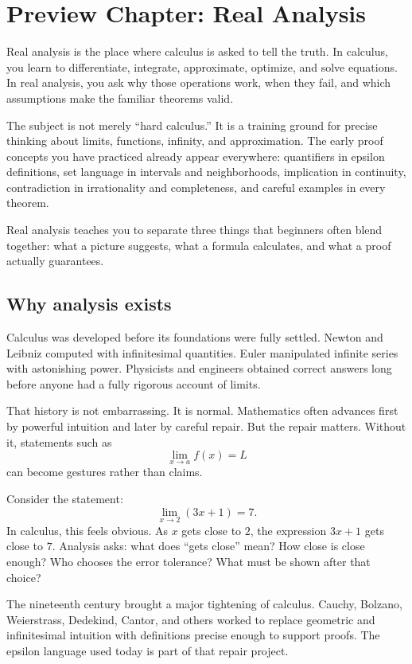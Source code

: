 \section{Preview Chapter: Real Analysis}

Real analysis is the place where calculus is asked to tell the truth. In calculus,
you learn to differentiate, integrate, approximate, optimize, and solve equations.
In real analysis, you ask why those operations work, when they fail, and which
assumptions make the familiar theorems valid.

The subject is not merely ``hard calculus.'' It is a training ground for precise
thinking about limits, functions, infinity, and approximation. The early proof
concepts you have practiced already appear everywhere: quantifiers in epsilon
definitions, set language in intervals and neighborhoods, implication in
continuity, contradiction in irrationality and completeness, and careful examples
in every theorem.

\begin{focusbox}
Real analysis teaches you to separate three things that beginners often blend
together: what a picture suggests, what a formula calculates, and what a proof
actually guarantees.
\end{focusbox}

\subsection{Why analysis exists}

Calculus was developed before its foundations were fully settled. Newton and
Leibniz computed with infinitesimal quantities. Euler manipulated infinite
series with astonishing power. Physicists and engineers obtained correct answers
long before anyone had a fully rigorous account of limits.

That history is not embarrassing. It is normal. Mathematics often advances first
by powerful intuition and later by careful repair. But the repair matters. Without
it, statements such as
\[
\lim_{x\to a} f(x)=L
\]
can become gestures rather than claims.

Consider the statement:
\[
\lim_{x\to 2} (3x+1)=7.
\]
In calculus, this feels obvious. As $x$ gets close to $2$, the expression $3x+1$
gets close to $7$. Analysis asks: what does ``gets close'' mean? How close is
close enough? Who chooses the error tolerance? What must be shown after that
choice?

\begin{historybox}
The nineteenth century brought a major tightening of calculus. Cauchy, Bolzano,
Weierstrass, Dedekind, Cantor, and others worked to replace geometric and
infinitesimal intuition with definitions precise enough to support proofs. The
epsilon language used today is part of that repair project.
\end{historybox}

